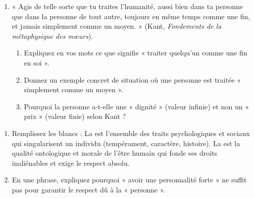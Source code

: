 \documentclass[11pt]{article}
\begin{document}
\begin{exercice}
\begin{enumerate}
    \item « Agis de telle sorte que tu traites l'humanité, aussi bien dans ta personne que dans la personne de tout autre, toujours en même temps comme une fin, et jamais simplement comme un moyen. » (Kant, \textit{Fondements de la métaphysique des mœurs}).
    \begin{enumerate}
        \item Expliquez en vos mots ce que signifie « traiter quelqu'un comme une fin en soi ».
        \item Donnez un exemple concret de situation où une personne est traitée « simplement comme un moyen ».
        \item Pourquoi la personne a-t-elle une « dignité » (valeur infinie) et non un « prix » (valeur finie) selon Kant ?
    \end{enumerate}
\end{enumerate}
\end{exercice}

\begin{exercice}
\begin{enumerate}
    \item Remplissez les blancs : La \underline{\hspace{4cm}} est l'ensemble des traits psychologiques et sociaux qui singularisent un individu (tempérament, caractère, histoire). La \underline{\hspace{4cm}} est la qualité ontologique et morale de l'être humain qui fonde ses droits inaliénables et exige le respect absolu.
    \item En une phrase, expliquez pourquoi « avoir une personnalité forte » ne suffit pas pour garantir le respect dû à la « personne ».
\end{enumerate}
\end{exercice}
\end{document}
